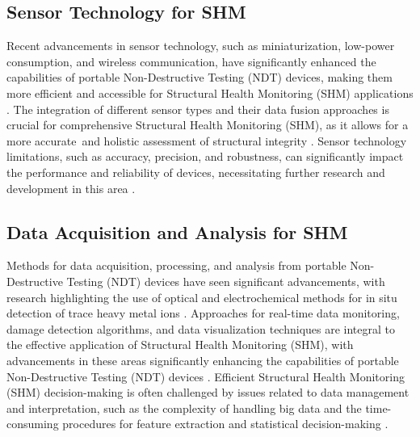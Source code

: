 \documentclass[journal, a4paper]{IEEEtran}
\begin{document}
\subsection{Sensor Technology for SHM}
Recent advancements in sensor technology, such as miniaturization, low-power consumption, and wireless communication,
have significantly enhanced the capabilities of portable Non-Destructive Testing (NDT) devices,
making them more efficient and accessible for Structural Health Monitoring (SHM) applications \cite{Hassani2023} \cite{Valeske2020}.
The integration of different sensor types and their data fusion approaches is crucial
for comprehensive Structural Health Monitoring (SHM), as it allows for a more accurate\
and holistic assessment of structural integrity \cite{Broer2022} \cite{Azimi2020}.
Sensor technology limitations, such as accuracy, precision, and robustness,
can significantly impact the performance and reliability of devices,
necessitating further research and development in this area \cite{Varshney2021} \cite{Moore2020}.


\subsection{Data Acquisition and Analysis for SHM}
Methods for data acquisition, processing, and analysis from portable Non-Destructive Testing (NDT)
devices have seen significant advancements, with research highlighting the use of optical
and electrochemical methods for in situ detection of trace heavy metal ions \cite{Hu2023}.
Approaches for real-time data monitoring, damage detection algorithms, and data visualization techniques
are integral to the effective application of Structural Health Monitoring (SHM), with advancements in these areas
significantly enhancing the capabilities of portable Non-Destructive Testing (NDT) devices \cite{Azimi2020} \cite{Lingxin2022}.
Efficient Structural Health Monitoring (SHM) decision-making is often challenged by issues related
to data management and interpretation, such as the complexity of handling big data and the time-consuming procedures
for feature extraction and statistical decision-making \cite{Entezami2020}.
\end{document}
